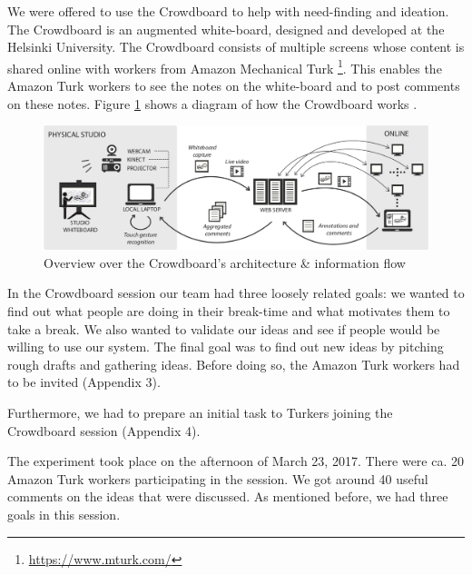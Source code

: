 We were offered to use the Crowdboard to help with  need-finding and ideation. The Crowdboard is an augmented white-board, designed and developed at the Helsinki University. The Crowdboard consists of multiple screens whose content is shared online with workers from Amazon Mechanical Turk \footnote{\url{https://www.mturk.com/}}. This enables the Amazon Turk workers to see the notes on the white-board and to post comments on these notes. Figure \ref{fig:crowdboard-diagram} shows a diagram of how the Crowdboard works \cite{crowdboard}. 

\begin{figure}[h]
 \centering
 \includegraphics[width=\textwidth]{images/crowdboard-diagram.png}
 \caption{Overview over the Crowdboard's architecture \& information flow \cite{crowdboard}}
 \label{fig:crowdboard-diagram}
\end{figure}

In the Crowdboard session our team had three loosely related goals: we wanted to find out what people are doing in their break-time and what motivates them to take a break. We also wanted to validate our ideas and see if people would be willing to use our system. The final goal was to find out new ideas by pitching rough drafts and gathering ideas. Before doing so, the Amazon Turk workers had to be invited (Appendix 3).

Furthermore, we had to prepare an initial task to Turkers joining the Crowdboard session (Appendix 4).

The experiment took place on the afternoon of March 23, 2017. There were ca. 20 Amazon Turk workers participating in the session. We got around 40 useful comments on the ideas that were discussed. As mentioned before, we had three goals in this session.

